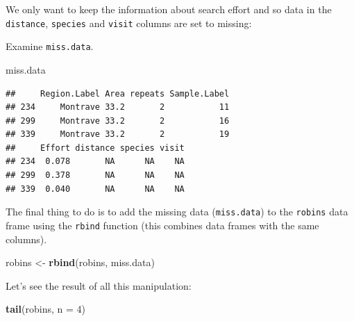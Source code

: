 \documentclass[10pt,a4paper]{tufte-handout}
\newenvironment{Shaded}{\begin{snugshade}}{\end{snugshade}}
\newcommand{\DataTypeTok}[1]{\textcolor[rgb]{0.13,0.29,0.53}{#1}}
\newcommand{\DecValTok}[1]{\textcolor[rgb]{0.00,0.00,0.81}{#1}}
\newcommand{\KeywordTok}[1]{\textcolor[rgb]{0.13,0.29,0.53}{\textbf{#1}}}
\newcommand{\NormalTok}[1]{#1}
\newcommand{\OperatorTok}[1]{\textcolor[rgb]{0.81,0.36,0.00}{\textbf{#1}}}
\newcommand{\OtherTok}[1]{\textcolor[rgb]{0.56,0.35,0.01}{#1}}
\newcommand{\StringTok}[1]{\textcolor[rgb]{0.31,0.60,0.02}{#1}}
\begin{document}
We only want to keep the information about search effort and so data in
the \texttt{distance}, \texttt{species} and \texttt{visit} columns are
set to missing:

\begin{Shaded}
\end{Shaded}

Examine \texttt{miss.data}.

\begin{Shaded}
\begin{Highlighting}[]
\NormalTok{miss.data}
\end{Highlighting}
\end{Shaded}

\begin{verbatim}
##     Region.Label Area repeats Sample.Label
## 234     Montrave 33.2       2           11
## 299     Montrave 33.2       2           16
## 339     Montrave 33.2       2           19
##     Effort distance species visit
## 234  0.078       NA      NA    NA
## 299  0.378       NA      NA    NA
## 339  0.040       NA      NA    NA
\end{verbatim}

The final thing to do is to add the missing data (\texttt{miss.data}) to
the \texttt{robins} data frame using the \texttt{rbind} function (this
combines data frames with the same columns).

\begin{Shaded}
\begin{Highlighting}[]
\NormalTok{robins <-}\StringTok{ }\KeywordTok{rbind}\NormalTok{(robins, miss.data)}
\end{Highlighting}
\end{Shaded}

Let's see the result of all this manipulation:

\begin{Shaded}
\begin{Highlighting}[]
\KeywordTok{tail}\NormalTok{(robins, }\DataTypeTok{n =} \DecValTok{4}\NormalTok{)}
\end{Highlighting}
\end{Shaded}
\end{document}
